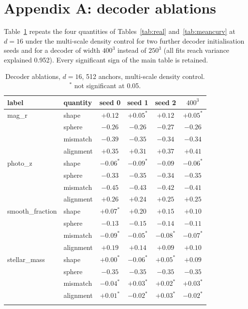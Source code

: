 \documentclass{article}
\begin{document}
\section*{Appendix A: decoder ablations}
Table~\ref{tab:ablate} repeats the four quantities of Tables~\ref{tab:real} and~\ref{tab:meancurv} at $d=16$ under the multi-scale density control for two further decoder initialisation seeds and for a decoder of width $400^3$ instead of $250^3$ (all fits reach variance explained 0.952). Every significant sign of the main table is retained.
\begin{table}[h]
\centering\footnotesize\setlength{\tabcolsep}{4pt}
\begin{tabular}{llcccc}
\toprule
label & quantity & seed 0 & seed 1 & seed 2 & $400^3$ \\
\midrule
mag\_r & shape & $+0.12$ & $+0.05^{*}$ & $+0.12$ & $+0.05^{*}$ \\
 & sphere & $-0.26$ & $-0.26$ & $-0.27$ & $-0.26$ \\
 & mismatch & $-0.39$ & $-0.35$ & $-0.34$ & $-0.34$ \\
 & alignment & $+0.35$ & $+0.31$ & $+0.37$ & $+0.41$ \\
\addlinespace[2pt]
photo\_z & shape & $-0.06^{*}$ & $-0.09^{*}$ & $-0.09$ & $-0.06^{*}$ \\
 & sphere & $-0.33$ & $-0.35$ & $-0.34$ & $-0.35$ \\
 & mismatch & $-0.45$ & $-0.43$ & $-0.42$ & $-0.41$ \\
 & alignment & $+0.26$ & $+0.24$ & $+0.25$ & $+0.25$ \\
\addlinespace[2pt]
smooth\_fraction & shape & $+0.07^{*}$ & $+0.20$ & $+0.15$ & $+0.10$ \\
 & sphere & $-0.13$ & $-0.15$ & $-0.14$ & $-0.11$ \\
 & mismatch & $-0.09^{*}$ & $-0.05^{*}$ & $-0.08^{*}$ & $-0.07^{*}$ \\
 & alignment & $+0.19$ & $+0.14$ & $+0.09$ & $+0.10$ \\
\addlinespace[2pt]
stellar\_mass & shape & $+0.00^{*}$ & $-0.06^{*}$ & $+0.05^{*}$ & $+0.09$ \\
 & sphere & $-0.35$ & $-0.35$ & $-0.35$ & $-0.35$ \\
 & mismatch & $-0.04^{*}$ & $+0.03^{*}$ & $+0.02^{*}$ & $+0.03^{*}$ \\
 & alignment & $+0.01^{*}$ & $-0.02^{*}$ & $+0.03^{*}$ & $-0.02^{*}$ \\
\addlinespace[2pt]
\bottomrule
\end{tabular}
\caption{Decoder ablations, $d=16$, 512 anchors, multi-scale density control. $^{*}$ not significant at 0.05.}
\label{tab:ablate}
\end{table}
\end{document}
